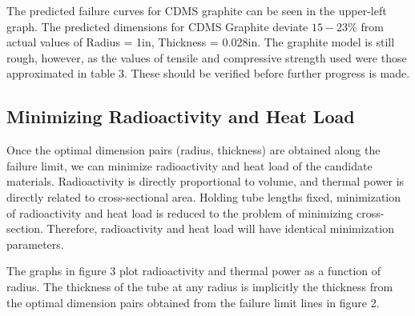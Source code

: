 \documentclass{report}
\begin{document}
The predicted failure curves for CDMS graphite can be seen in the upper-left graph. The predicted dimensions for CDMS Graphite deviate $15-23\%$ from actual values of Radius = 1in, Thickness = 0.028in. The graphite model is still rough, however, as the values of tensile and compressive strength used were those approximated in table 3. These should be verified before further progress is made.

\subsection{Minimizing Radioactivity and Heat Load}

Once the optimal dimension pairs (radius, thickness) are obtained along the failure limit, we can minimize radioactivity and heat load of the candidate materials. Radioactivity is
directly proportional to volume, and thermal power is directly related to cross-sectional area. Holding tube lengths fixed, minimization of radioactivity and heat load is reduced
to the problem of minimizing cross-section. Therefore, radioactivity and heat load will have identical minimization parameters.

The graphs in figure 3 plot radioactivity and thermal power as a function of radius. The thickness of the tube at any radius is implicitly the thickness from the optimal dimension
pairs obtained from the failure limit lines in figure 2.

\end{document}
